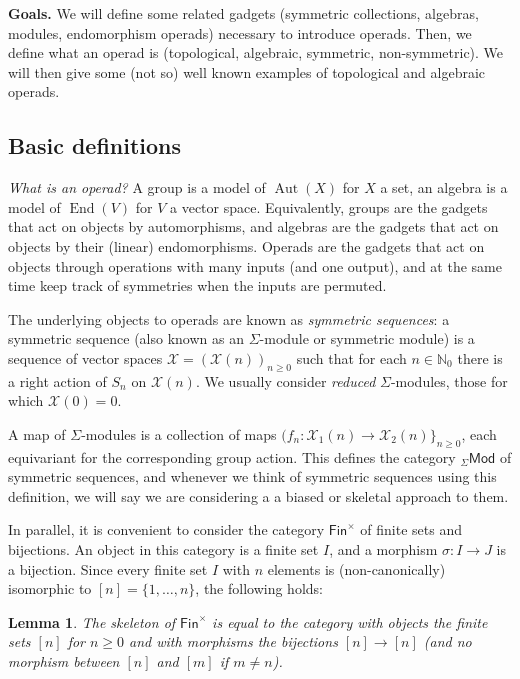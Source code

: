 \documentclass[fleqn, a4paper, twoside]{article}
\newcommand{\0}{\langle 0\rangle}
\newcommand{\XX}{\mathcal{X}}
\newcommand{\End}{\operatorname{End}}
\DeclareRobustCommand{\[}{\begin{equation}}%
\DeclareRobustCommand{\]}{\end{equation}}%
\theoremstyle{mytheorem}
\newtheorem{lemma}[theorem]{Lemma}
\theoremstyle{introthm}
\theoremstyle{mydefinition}
\theoremstyle{mydefinition2}
\theoremstyle{plain} %
\newcommand{\GSet}{\mathsf{Fin}^\times}
\newcommand{\SMod}{{}_\Sigma\mathsf{Mod}}
\newcommand{\?}{\,?\,}
\newcommand{\NN}{\mathbb N}
\theoremstyle{mytheorem}
\theoremstyle{plain} %
\begin{document}
\textbf{Goals.}
We will define
some related gadgets (symmetric collections,
algebras, modules, endomorphism operads)
necessary to introduce operads. 
Then, we define what an operad is (topological,
algebraic, symmetric, non-symmetric). 
We will then give some
(not so) well known examples of topological
and algebraic operads.

\subsection{Basic definitions}
\emph{What is an operad?} A group is a model of
$\operatorname{Aut}(X)$ for $X$ a set, an algebra
is a model of $\End(V)$ for $V$
a vector space. Equivalently, groups are the
gadgets that act on objects by automorphisms,
and algebras are the gadgets that act
on objects by their (linear) endomorphisms. 
Operads are the gadgets that act on
objects through operations with many 
inputs (and one output), and at the same
time keep track of symmetries when
the inputs are permuted.

The underlying objects to operads are known as
\emph{symmetric sequences}: a symmetric sequence
(also known as an $\Sigma$-module or symmetric 
module) is a sequence of vector spaces
$\XX = (\XX(n))_{n\geqslant 0}$ such that for
each $n\in\NN_0$ there is a right action of
$S_n$ on $\XX(n)$. We usually consider \emph{reduced}
$\Sigma$-modules, those for which $\XX(0)=0$.

A map of $\Sigma$-modules is a collection of maps
$(f_n : \XX_1(n) \longrightarrow \XX_2(n)\}_{n\geqslant 0}$,
each equivariant for the corresponding group action. 
This defines the category $\SMod$ of symmetric
sequences, and whenever we think of symmetric sequences
using this definition, we will say we are considering a 
a biased or skeletal approach to them.

In parallel, it is convenient to consider the 
category $\GSet$ of finite sets and bijections.
An object in this category is a finite set $I$,
and a morphism $\sigma : I\longrightarrow J$ is a
bijection. Since every finite set $I$ with $n$
elements is (non-canonically) isomorphic to 
$[n] =\{1,\ldots,n\}$, the following holds:

\begin{lemma} The skeleton of $\GSet$ is
equal to the category with objects the finite sets
$[n]$ for $n\geqslant 0$ and with morphisms the
bijections $[n]\longrightarrow [n]$ (and no morphism
between $[n]$ and $[m]$ if $m\neq n$).
\end{lemma}
\end{document}
